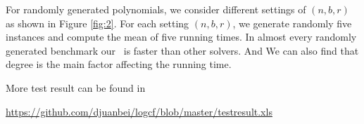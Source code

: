 %
%
%
%
%
%
%
%
%
%
%



For randomly generated polynomials, we consider different settings of
$(n,b,r)$ as shown in Figure \ref{fig:2}. For each setting $(n,b,r)$, we generate randomly five instances and  compute the mean of five running times. In almost every randomly generated benchmark our \froot\  is  faster than other  solvers. And We can also  find that
degree is the main factor affecting the  running time.

{\color{red} More test result can be found in
	
	 \url{https://github.com/djuanbei/logcf/blob/master/testresult.xls}}

